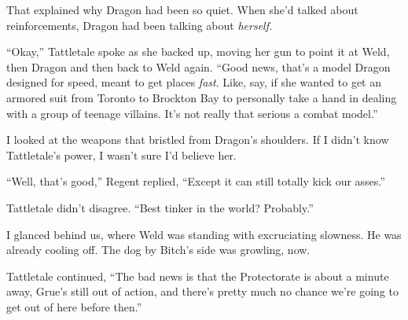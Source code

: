 That explained why Dragon had been so quiet.  When she'd talked about reinforcements, Dragon had been talking about \emph{herself.}



``Okay,'' Tattletale spoke as she backed up, moving her gun to point it at Weld, then Dragon and then back to Weld again.  ``Good news, that's a model Dragon designed for speed, meant to get places \emph{fast}.  Like, say, if she wanted to get an armored suit from Toronto to Brockton Bay to personally take a hand in dealing with a group of teenage villains.  It's not really that serious a combat model.''



I looked at the weapons that bristled from Dragon's shoulders.  If I didn't know Tattletale's power, I wasn't sure I'd believe her.



``Well, that's good,'' Regent replied, ``Except it can still totally kick our asses.''



Tattletale didn't disagree.  ``Best tinker in the world?  Probably.''



I glanced behind us, where Weld was standing with excruciating slowness.  He was already cooling off.  The dog by Bitch's side was growling, now.



Tattletale continued, ``The bad news is that the Protectorate is about a minute away, Grue's still out of action, and there's pretty much no chance we're going to get out of here before then.''





